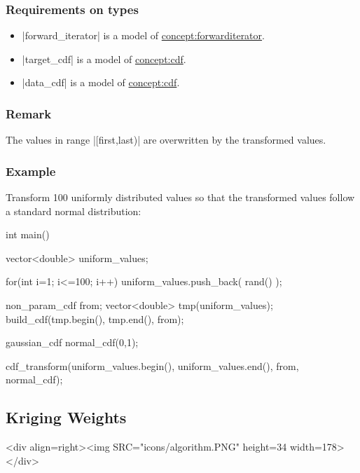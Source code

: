 \documentclass[12pt,twoside]{report}
\begin{document}
\htmlrule[CLEAR=all]  \subsubsection*{Requirements on types}
\begin{itemize}
\item |forward_iterator| is a model of \hyperref{Forward Iterator}{Forward Iterator}{}{concept:forwarditerator}.
\item |target_cdf| is a model of \hyperref{Cdf}{CDF}{}{concept:cdf}.
\item |data_cdf| is a model of \hyperref{Cdf}{CDF}{}{concept:cdf}.
\end{itemize}

\htmlrule[CLEAR=all]  \subsubsection*{Remark}
The values in range |[first,last)| are overwritten by the transformed values.

\htmlrule[CLEAR=all]  \subsubsection*{Example}
Transform 100 uniformly distributed values so that the transformed values follow a standard normal distribution:


\begin{code}
int main()
{
  vector<double> uniform_values;

  for(int i=1; i<=100; i++)
    uniform_values.push_back( rand() );

  non_param_cdf from;
  vector<double> tmp(uniform_values);
  build_cdf(tmp.begin(), tmp.end(), from);

  gaussian_cdf normal_cdf(0,1);

  cdf_transform(uniform_values.begin(), uniform_values.end(),
                from, normal_cdf);
}
\end{code}











\subsection{Kriging Weights}
\begin{htmlonly}
<div align=right><img SRC="icons/algorithm.PNG" height=34 width=178></div>
\end{htmlonly}
\end{document}
